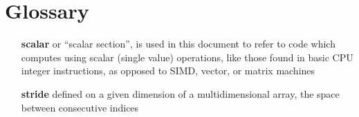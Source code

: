 \documentclass[acmsmall, nonacm=true]{acmart}
\begin{document}
\section*{Glossary}
\vspace{1em}
\begin{itemize}
\item[\textbf{scalar}]  {or ``scalar section'', is used in this document to refer to code which computes using scalar (single value) operations, like those found in basic CPU integer instructions, as opposed to SIMD, vector, or matrix machines}

\item[\textbf{stride}]  {defined on a given dimension of a multidimensional array, the space between consecutive indices}
\end{itemize}

\end{document}
